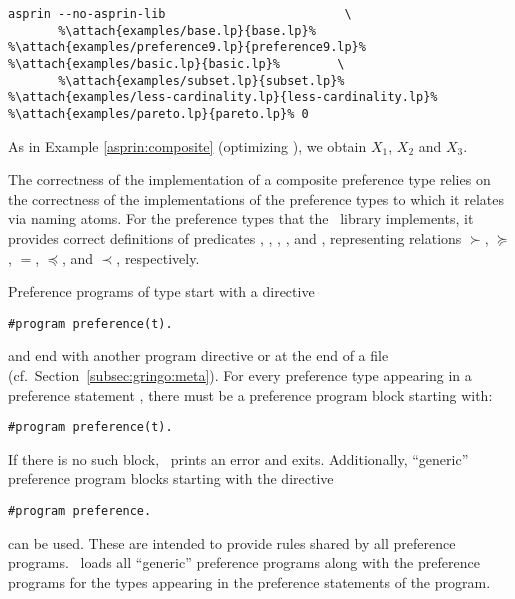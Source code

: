 \begin{example}
{  }
\begin{lstlisting}[numbers=none,escapechar=\%]
asprin --no-asprin-lib                         \
       %\attach{examples/base.lp}{base.lp}% %\attach{examples/preference9.lp}{preference9.lp}%  %\attach{examples/basic.lp}{basic.lp}%        \
       %\attach{examples/subset.lp}{subset.lp}% %\attach{examples/less-cardinality.lp}{less-cardinality.lp}% %\attach{examples/pareto.lp}{pareto.lp}% 0
\end{lstlisting}
As in Example \ref{asprin:composite} (optimizing ), we obtain $X_1$, $X_2$ and $X_3$.
\end{example}

\begin{note}
The correctness of the implementation of a composite preference type relies on the 
correctness of the implementations of the preference types to which it relates via naming atoms.
For the preference types that the \asprin\ library implements,
it provides correct definitions of predicates 
\code{better/1}, \code{bettereq/1}, \code{eq/1}, \code{worseeq/1}, and , 
representing relations $\succ$, $\succeq$, $=$, $\preceq$, and $\prec$, respectively. 
\end{note}


\begin{note}
Preference programs of type  start with a directive
\begin{lstlisting}[numbers=none]
#program preference(t).
\end{lstlisting}
and end with another program directive or at the end of a file
(cf.~Section~\ref{subsec:gringo:meta}).
For every preference type  appearing in a preference statement , 
there must be a preference program block starting with:
\begin{lstlisting}[numbers=none]
#program preference(t).
\end{lstlisting}
If there is no such block, \asprin\ prints an error and exits.
Additionally, ``generic'' preference program blocks starting with the directive
\begin{lstlisting}[numbers=none]
#program preference.
\end{lstlisting}
can be used. 
These are intended to provide rules shared by all preference programs.
\asprin\ loads all ``generic'' preference programs along with 
the preference programs for the types appearing in the preference statements of the program.
\end{note}

